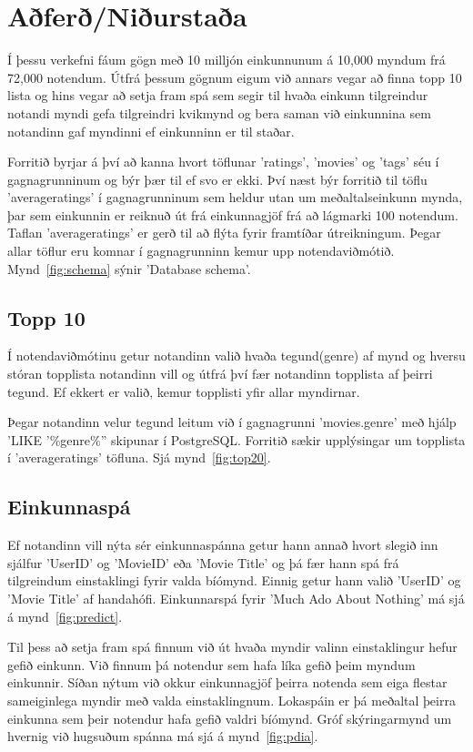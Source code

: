 \documentclass[11pt,a4paper]{amsart}
\theoremstyle{plain}
\theoremstyle{definition}
\theoremstyle{remark}
\begin{document}


\section{Aðferð/Niðurstaða}
Í þessu verkefni fáum gögn með 10 milljón einkunnunum á 10,000 myndum frá 72,000 notendum.
Útfrá þessum gögnum eigum við annars vegar að finna topp 10 lista og hins vegar að setja fram spá sem segir til hvaða einkunn tilgreindur notandi myndi gefa tilgreindri kvikmynd og bera saman við einkunnina sem notandinn gaf myndinni ef einkunninn er til staðar.  
\\\par
Forritið byrjar á því að kanna hvort töflunar 'ratings', 'movies' og 'tags' séu í gagnagrunninum og býr þær til ef svo er ekki. Því næst býr forritið til töflu 'averageratings' í gagnagrunninum sem heldur utan um meðaltalseinkunn mynda, þar sem einkunnin er reiknuð út frá einkunnagjöf frá að lágmarki 100 notendum. Taflan 'averageratings' er gerð til að flýta fyrir framtíðar útreikningum. Þegar allar töflur eru komnar í gagnagrunninn kemur upp notendaviðmótið. Mynd~\ref{fig:schema} sýnir 'Database schema'.

\subsection{Topp 10}
Í notendaviðmótinu getur notandinn valið hvaða tegund(genre) af mynd og hversu stóran topplista notandinn vill og útfrá því fær notandinn topplista af þeirri tegund. Ef ekkert er valið, kemur topplisti yfir allar myndirnar.\par Þegar notandinn velur tegund leitum við í gagnagrunni 'movies.genre' með hjálp 'LIKE '\%genre\%'' skipunar í PostgreSQL. Forritið sækir upplýsingar um topplista í 'averageratings' töfluna. Sjá mynd~\ref{fig:top20}.

\subsection{Einkunnaspá}
Ef notandinn vill nýta sér einkunnaspánna getur hann annað hvort slegið inn sjálfur 'UserID' og 'MovieID' eða 'Movie Title' og þá fær hann spá frá tilgreindum einstaklingi fyrir valda bíómynd. Einnig getur hann valið 'UserID' og 'Movie Title' af handahófi. Einkunnarspá fyrir 'Much Ado About Nothing' má sjá á mynd~\ref{fig:predict}.\par
Til þess að setja fram spá finnum við út hvaða myndir valinn einstaklingur hefur gefið einkunn. Við finnum þá notendur sem hafa líka gefið þeim myndum einkunnir. Síðan nýtum við okkur einkunnagjöf þeirra notenda sem eiga flestar sameiginlega myndir með valda einstaklingnum. Lokaspáin er þá meðaltal þeirra einkunna sem þeir notendur hafa gefið valdri bíómynd. Gróf skýringarmynd um hvernig við hugsuðum spánna má sjá á mynd~\ref{fig:pdia}.
\end{document}
